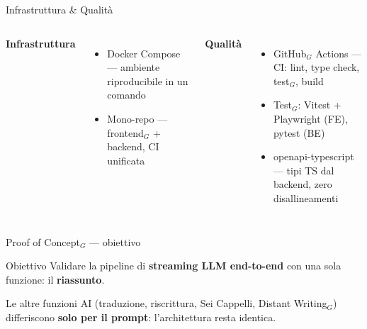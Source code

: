 \documentclass[aspectratio=169,11pt]{beamer}
\begin{document}
\begin{frame}{Infrastruttura \& Qualità}
  \begin{columns}[T]
    {\bfseries Infrastruttura}
    \begin{itemize}
      \item Docker Compose --- ambiente riproducibile in un comando
      \item Mono-repo --- frontend$_G$ + backend, CI unificata
    \end{itemize}
    {\bfseries Qualità}
    \begin{itemize}
      \item GitHub$_G$ Actions --- CI: lint, type check, test$_G$, build
      \item Test$_G$: Vitest + Playwright (FE), pytest (BE)
      \item openapi-typescript --- tipi TS dal backend, zero disallineamenti
    \end{itemize}
  \end{columns}
\end{frame}

\begin{frame}{Proof of Concept$_G$ --- obiettivo}
  \begin{block}{Obiettivo}
    Validare la pipeline di \textbf{streaming LLM end-to-end} con una sola funzione: il \textbf{riassunto}.
  \end{block}
  \vspace{4pt}
  \begin{center}
  \end{center}
  \vspace{2pt}
  {\color{sbnavy}\small Le altre funzioni AI (traduzione, riscrittura, Sei Cappelli, Distant Writing$_G$) differiscono \textbf{solo per il prompt}: l'architettura resta identica.}
\end{frame}
\end{document}
